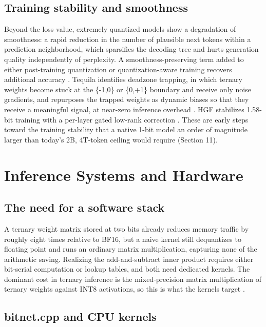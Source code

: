 \documentclass[11pt]{article}
\begin{document}
\subsection{Training stability and smoothness}

Beyond the loss value, extremely quantized models show a degradation of smoothness: a
rapid reduction in the number of plausible next tokens within a prediction
neighborhood, which sparsifies the decoding tree and hurts generation quality
independently of perplexity. A smoothness-preserving term added to either post-training
quantization or quantization-aware training recovers additional accuracy
\cite{Xu2026-FittingNotEnough}. Tequila identifies deadzone trapping, in which ternary
weights become stuck at the \{-1,0\} or \{0,+1\} boundary and receive only noise gradients,
and repurposes the trapped weights as dynamic biases so that they receive a meaningful
signal, at near-zero inference overhead \cite{Huang2025-Tequila}. HGF stabilizes 1.58-bit
training with a per-layer gated low-rank correction \cite{Anon2026-HGF}. These are early
steps toward the training stability that a native 1-bit model an order of magnitude
larger than today's 2B, 4T-token ceiling would require (Section 11).


\section{Inference Systems and Hardware}

\subsection{The need for a software stack}

A ternary weight matrix stored at two bits already reduces memory traffic by roughly
eight times relative to BF16, but a naive kernel still dequantizes to floating point and
runs an ordinary matrix multiplication, capturing none of the arithmetic saving.
Realizing the add-and-subtract inner product requires either bit-serial computation or
lookup tables, and both need dedicated kernels. The dominant cost in ternary inference
is the mixed-precision matrix multiplication of ternary weights against INT8
activations, so this is what the kernels target \cite{Wang2025-BitNetCPP}.

\subsection{bitnet.cpp and CPU kernels}
\end{document}

